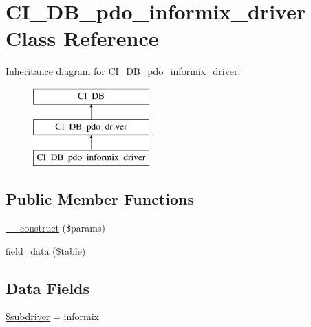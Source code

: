 \hypertarget{class_c_i___d_b__pdo__informix__driver}{}\section{C\+I\+\_\+\+D\+B\+\_\+pdo\+\_\+informix\+\_\+driver Class Reference}
\label{class_c_i___d_b__pdo__informix__driver}
Inheritance diagram for C\+I\+\_\+\+D\+B\+\_\+pdo\+\_\+informix\+\_\+driver\+:\begin{figure}[H]
\begin{center}
\leavevmode
\includegraphics[height=3.000000cm]{class_c_i___d_b__pdo__informix__driver}
\end{center}
\end{figure}
\subsection*{Public Member Functions}
\begin{DoxyCompactItemize}
\item 
\mbox{\hyperlink{class_c_i___d_b__pdo__informix__driver_a9162320adff1a1a4afd7f2372f753a3e}{\+\_\+\+\_\+construct}} (\$params)
\item 
\mbox{\hyperlink{class_c_i___d_b__pdo__informix__driver_a90355121e1ed009e0efdbd544ab56efa}{field\+\_\+data}} (\$table)
\end{DoxyCompactItemize}
\subsection*{Data Fields}
\begin{DoxyCompactItemize}
\item 
\mbox{\hyperlink{class_c_i___d_b__pdo__informix__driver_a1322ca756348b11d080cb7a4f590de15}{\$subdriver}} = \textquotesingle{}informix\textquotesingle{}
\end{DoxyCompactItemize}
